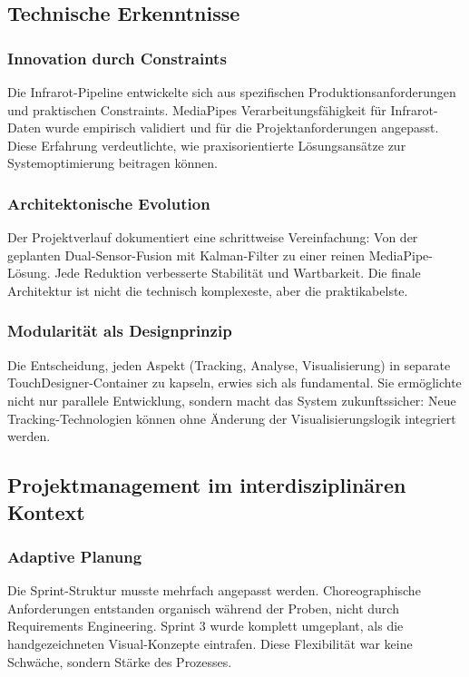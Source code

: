 
\subsection{Technische Erkenntnisse}

\subsubsection{Innovation durch Constraints}

Die Infrarot-Pipeline entwickelte sich aus spezifischen Produktionsanforderungen und praktischen Constraints. MediaPipes Verarbeitungsfähigkeit für Infrarot-Daten wurde empirisch validiert und für die Projektanforderungen angepasst. Diese Erfahrung verdeutlichte, wie praxisorientierte Lösungsansätze zur Systemoptimierung beitragen können.

\subsubsection{Architektonische Evolution}

Der Projektverlauf dokumentiert eine schrittweise Vereinfachung: Von der geplanten Dual-Sensor-Fusion mit Kalman-Filter zu einer reinen MediaPipe-Lösung. Jede Reduktion verbesserte Stabilität und Wartbarkeit. Die finale Architektur ist nicht die technisch komplexeste, aber die praktikabelste.

\subsubsection{Modularität als Designprinzip}

Die Entscheidung, jeden Aspekt (Tracking, Analyse, Visualisierung) in separate TouchDesigner-Container zu kapseln, erwies sich als fundamental. Sie ermöglichte nicht nur parallele Entwicklung, sondern macht das System zukunftssicher: Neue Tracking-Technologien können ohne Änderung der Visualisierungslogik integriert werden.

\subsection{Projektmanagement im interdisziplinären Kontext}

\subsubsection{Adaptive Planung}

Die Sprint-Struktur musste mehrfach angepasst werden. Choreographische Anforderungen entstanden organisch während der Proben, nicht durch Requirements Engineering. Sprint 3 wurde komplett umgeplant, als die handgezeichneten Visual-Konzepte eintrafen. Diese Flexibilität war keine Schwäche, sondern Stärke des Prozesses.

